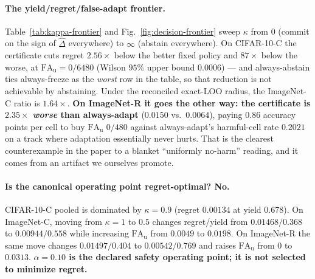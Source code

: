 \paragraph{The yield/regret/false-adapt frontier.} Table~\ref{tab:kappa-frontier} and
Fig.~\ref{fig:decision-frontier} sweep $\kappa$ from $0$ (commit on the sign of $\widehat\Delta$
everywhere) to $\infty$ (abstain everywhere). On CIFAR-10-C the certificate cuts regret $2.56\times$
below the better fixed policy and $87\times$ below the worse, at $\mathrm{FA}_{\mathrm u}=0/6480$
(Wilson $95\%$ upper bound $0.0006$) --- and always-abstain ties always-freeze as the \emph{worst}
row in the table, so that reduction is not achievable by abstaining. Under the reconciled exact-LOO
radius, the ImageNet-C ratio is $1.64\times$.
\textbf{On ImageNet-R it goes the other way: the certificate is $2.35\times$ \emph{worse} than
always-adapt} ($0.0150$ vs.\ $0.0064$), paying $0.86$ accuracy points per cell to buy
$\mathrm{FA}_{\mathrm u}$ $0/480$ against always-adapt's harmful-cell rate $0.2021$ on a track where adaptation essentially never
hurts. That is the clearest counterexample in the paper to a blanket ``uniformly no-harm'' reading,
and it comes from an artifact we ourselves promote.

\paragraph{Is the canonical operating point regret-optimal? No.} CIFAR-10-C pooled is dominated by
$\kappa=0.9$ (regret $0.00134$ at yield $0.678$). On ImageNet-C, moving from $\kappa=1$ to $0.5$
changes regret/yield from $0.01468/0.368$ to $0.00944/0.558$ while increasing
$\mathrm{FA}_{\mathrm u}$ from $0.0049$ to $0.0198$. On ImageNet-R the same move changes
$0.01497/0.404$ to $0.00542/0.769$ and raises $\mathrm{FA}_{\mathrm u}$ from $0$ to $0.0313$.
\textbf{$\alpha=0.10$ is the declared safety operating point; it is not selected to minimize regret.}

